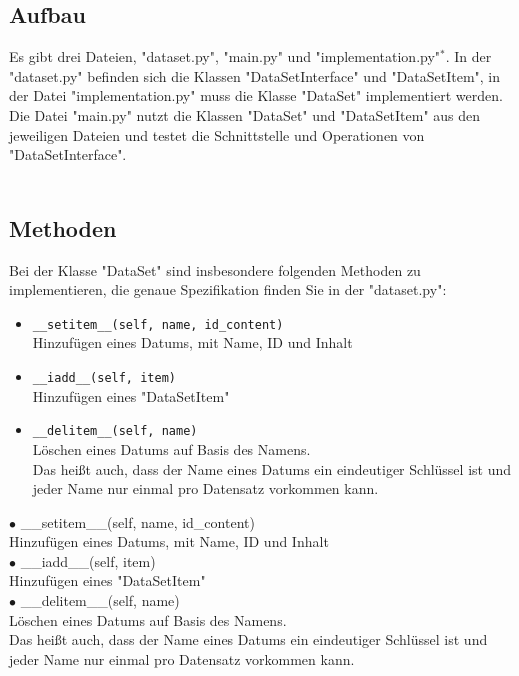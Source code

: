 \documentclass[12pt]{article}
\begin{document}
\subsection{Aufbau}
Es gibt drei Dateien, "dataset.py", "main.py" und "implementation.py"$^*$.
In der "dataset.py" befinden sich die Klassen "DataSetInterface" und "DataSetItem",
in der Datei "implementation.py" muss die Klasse "DataSet" implementiert werden.
Die Datei "main.py" nutzt die Klassen "DataSet" und "DataSetItem" aus den jeweiligen Dateien und testet die Schnittstelle und Operationen von "DataSetInterface".\\
\\
\subsection{Methoden}
Bei der Klasse "DataSet" sind insbesondere folgenden Methoden zu implementieren, die genaue Spezifikation finden Sie in der "dataset.py":\\
\begin{itemize}
    \item \texttt{\_\_setitem\_\_(self, name, id\_content)}\\Hinzufügen eines Datums, mit Name, ID und Inhalt
    \item \texttt{\_\_iadd\_\_(self, item)}\\Hinzufügen eines "DataSetItem"
    \item \texttt{\_\_delitem\_\_(self, name)}\\Löschen eines Datums auf Basis des Namens.\\Das heißt auch, dass der Name eines Datums ein eindeutiger Schlüssel ist und jeder Name nur einmal pro Datensatz vorkommen kann.
\end{itemize}
$\bullet$ \_\_setitem\_\_(self, name, id\_content)\\
\hspace*{1cm} Hinzufügen eines Datums, mit Name, ID und Inhalt\\
$\bullet$ \_\_iadd\_\_(self, item)\\
\hspace*{1cm} Hinzufügen eines "DataSetItem"\\
$\bullet$ \_\_delitem\_\_(self, name)\\
\hspace*{1cm} Löschen eines Datums auf Basis des Namens.\\
\hspace*{1cm} Das heißt auch, dass der Name eines Datums ein eindeutiger Schlüssel ist und jeder Name nur einmal pro Datensatz vorkommen kann.\\
\end{document}
